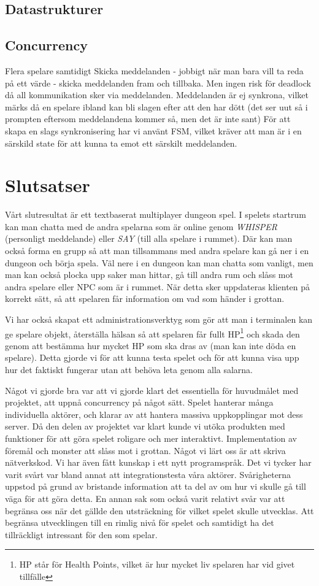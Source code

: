 \documentclass[a4paper]{article}
\begin{document}
\subsection{Datastrukturer}

\subsection{Concurrency}
Flera spelare samtidigt
Skicka meddelanden - jobbigt när man bara vill ta reda på ett värde - skicka meddelanden fram och tillbaka. Men ingen risk för deadlock då all kommunikation sker via meddelanden. 
Meddelanden är ej synkrona, vilket märks då en spelare ibland kan bli slagen efter att den har dött (det ser uut så i prompten eftersom meddelandena kommer så, men det är inte sant)
För att skapa en slags synkronisering har vi använt FSM, vilket kräver att man är i en särskild state för att kunna ta emot ett särskilt meddelanden. 

\section{Slutsatser}
Vårt slutresultat är ett textbaserat multiplayer dungeon spel. I spelets startrum kan man chatta med de andra spelarna som är online genom \textit{WHISPER} (personligt meddelande) eller \textit{SAY} (till alla spelare i rummet). Där kan man också forma en grupp så att man tillsammans med andra spelare kan gå ner i en dungeon och börja spela. Väl nere i en dungeon kan man chatta som vanligt, men man kan också plocka upp saker man hittar, gå till andra rum och slåss mot andra spelare eller NPC som är i rummet. När detta sker uppdateras klienten på korrekt sätt, så att spelaren får information om vad som händer i grottan.

Vi har också skapat ett administrationsverktyg som gör att man i terminalen kan ge spelare objekt, återställa hälsan så att spelaren får fullt HP\footnote{HP står för Health Points, vilket är hur mycket liv spelaren har vid givet tillfälle} och skada den genom att bestämma hur mycket HP som ska dras av (man kan inte döda en spelare). Detta gjorde vi för att kunna testa spelet och för att kunna visa upp hur det faktiskt fungerar utan att behöva leta genom alla salarna.     

Något vi gjorde bra var att vi gjorde klart det essentiella för huvudmålet med projektet, att uppnå concurrency på något sätt. Spelet hanterar många individuella aktörer, och klarar av att hantera massiva uppkopplingar mot dess server. 
Då den delen av projektet var klart kunde vi utöka produkten med funktioner för att göra spelet roligare och mer interaktivt. 
Implementation av föremål och monster att slåss mot i grottan. 
Något vi lärt oss är att skriva nätverkskod. Vi har även fått kunskap i ett nytt programspråk.
Det vi tycker har varit svårt var bland annat att integrationstesta våra aktörer. Svårigheterna uppstod på grund av bristande 
information att ta del av om hur vi skulle gå till väga för att göra detta. En annan sak som också varit relativt svår var att 
begränsa oss när det gällde den utsträckning för vilket spelet skulle utvecklas. Att begränsa utvecklingen till en rimlig nivå för spelet 
och samtidigt ha det tillräckligt intressant för den som spelar.
\end{document}
